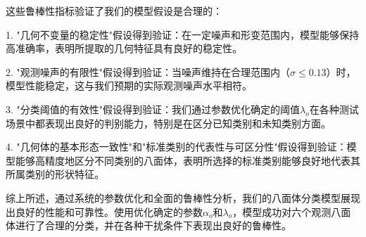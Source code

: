 这些鲁棒性指标验证了我们的模型假设是合理的：

1. "几何不变量的稳定性"假设得到验证：在一定噪声和形变范围内，模型能够保持高准确率，表明所提取的几何特征具有良好的稳定性。

2. "观测噪声的有限性"假设得到验证：当噪声维持在合理范围内（$\sigma \leq 0.13$）时，模型性能稳定，这与我们预期的实际观测噪声水平相符。

3. "分类阈值的有效性"假设得到验证：我们通过参数优化确定的阈值$\lambda_o$在各种测试场景中都表现出良好的判别能力，特别是在区分已知类别和未知类别方面。

4. "几何体的基本形态一致性"和"标准类别的代表性与可区分性"假设得到验证：模型能够高精度地区分不同类别的八面体，表明所选择的标准类别能够良好地代表其所属类别的形状特征。

综上所述，通过系统的参数优化和全面的鲁棒性分析，我们的八面体分类模型展现出良好的性能和可靠性。使用优化确定的参数$\alpha_o$和$\lambda_o$，模型成功对六个观测八面体进行了合理的分类，并在各种干扰条件下表现出良好的鲁棒性。